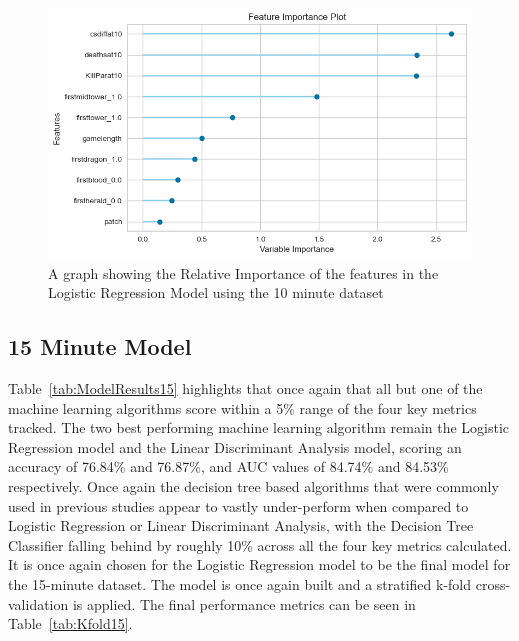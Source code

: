 \begin{figure}[h]
    \centering
    \includegraphics[width=\textwidth]{figures/FeatureImport10}
    \caption{A graph showing the Relative Importance of the features in the Logistic Regression Model using the 10 minute dataset}
    \label{fig:FeatureImport10}
\end{figure}

\newpage

\subsection{15 Minute Model}\label{subsec:15-minute-model}

Table~\ref{tab:ModelResults15} highlights that once again that all but one of the machine learning algorithms score within a 5\% range of the four key metrics tracked.
The two best performing machine learning algorithm remain the Logistic Regression model and the Linear Discriminant Analysis model, scoring an accuracy of 76.84\% and 76.87\%,  and AUC values of 84.74\% and 84.53\% respectively.
Once again the decision tree based algorithms that were commonly used in previous studies appear to vastly under-perform when compared to Logistic Regression or Linear Discriminant Analysis, with the Decision Tree Classifier falling behind by roughly 10\% across all the four key metrics calculated.
It is once again chosen for the Logistic Regression model to be the final model for the 15-minute dataset.
The model is once again built and a stratified k-fold cross-validation is applied.
The final performance metrics can be seen in Table~\ref{tab:Kfold15}. \\

